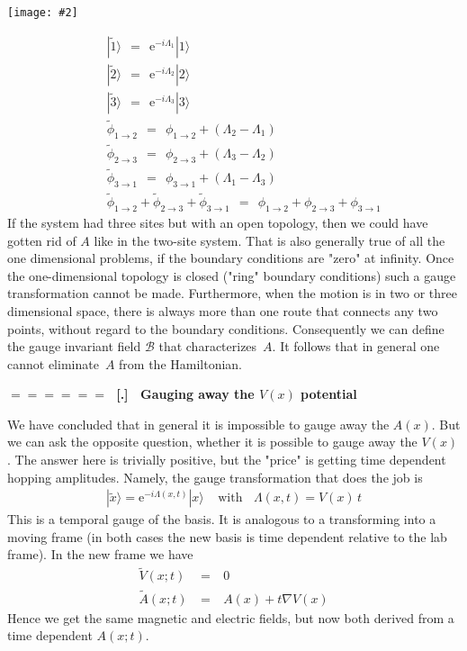\documentclass[onecolumn,fleqn]{revtex4}
\newcommand{\putgraph}[2][0.30\hsize]{\texttt{[image: \#2]}}
\newcommand{\beq}{\begin{eqnarray}}
\newcommand{\eeq}{\end{eqnarray}}
\renewcommand{\thesubsection}{\arabic{subsection}}
\renewcommand{\thesubsubsection}{\arabic{subsubsection}}
\newcommand{\sheadC}[1]
{
\addtocounter{subsubsection}{1}
\vspace{5mm}
{\Large\bf $=\!=\!=\!=\!=\!=\;$ [\thesubsection.\thesubsubsection] \ #1}  
\nopagebreak
\phantomsection
}
\begin{document}
\begin{center}
\putgraph[0.2\hsize]{ClosedThreeSiteSystem}
\end{center}


\beq
&& | \tilde{1} \rangle \ \ = \ \ \mbox{e}^{-i \Lambda_1} | 1 \rangle 
\\ \nonumber
&& | \tilde{2} \rangle \ \ = \ \ \mbox{e}^{-i \Lambda_2} | 2 \rangle 
\\ \nonumber
&& | \tilde{3} \rangle \ \ = \ \ \mbox{e}^{-i \Lambda_3} | 3 \rangle 
\\ \nonumber
&& \tilde{\phi}_{1\rightarrow 2} \ \ = \ \ \phi_{1\rightarrow 2} + ( \Lambda_2 - \Lambda_1 ) 
\\ \nonumber
&& \tilde{\phi}_{2\rightarrow 3} \ \ = \ \ \phi_{2\rightarrow 3} + ( \Lambda_3 - \Lambda_2 ) 
\\ \nonumber
&& \tilde{\phi}_{3\rightarrow 1} \ \ = \ \ \phi_{3\rightarrow 1} + ( \Lambda_1 - \Lambda_3 ) 
\\ \nonumber
&& \tilde{\phi}_{1\rightarrow 2} + \tilde{\phi}_{2\rightarrow 3} + \tilde{\phi}_{3\rightarrow 1} 
\ \ = \ \ \phi_{1\rightarrow 2} + \phi_{2\rightarrow 3} + \phi_{3\rightarrow 1} 
\eeq
If the system had three sites but with an open topology, 
then we could have gotten rid of $A$ like in the two-site system. 
That is also generally true of all the one dimensional problems, 
if the boundary conditions are "zero" at infinity. 
Once the one-dimensional topology is closed ("ring" boundary conditions) 
such a gauge transformation cannot be made. Furthermore, 
when the motion is in two or three dimensional space, there is 
always more than one route that connects any two points, without 
regard to the boundary conditions. Consequently 
we can define the gauge invariant field $\mathcal{B}$ that 
characterizes~$A$. It follows that in general one cannot eliminate~$A$ 
from the Hamiltonian.  


\sheadC{Gauging away the $V(x)$ potential}

We have concluded that in general it is impossible to gauge away the $A(x)$. 
But we can ask the opposite question, whether it is possible to gauge away the $V(x)$. 
The answer here is trivially positive, but the "price" is getting time dependent 
hopping amplitudes. Namely, the gauge transformation that does the job is 
\beq
| \tilde{x} \rangle = \mbox{e}^{-i \Lambda(x,t)} | x \rangle 
\ \ \ \ \ \mbox{with} \ \ \ \ \Lambda(x,t)=V(x) \, t
\eeq  
This is a temporal gauge of the basis. It is analogous to a transforming into a moving frame 
(in both cases the new basis is time dependent relative to the lab frame). 
In the new frame we have 
\beq
\tilde{V}(x;t) \ &=& \ 0 \\
\tilde{A}(x;t) \ &=& \ A(x) + t\nabla V(x)   
\eeq 
Hence we get the same magnetic and electric fields, 
but now both derived from a time dependent $A(x;t)$. 
\end{document}
